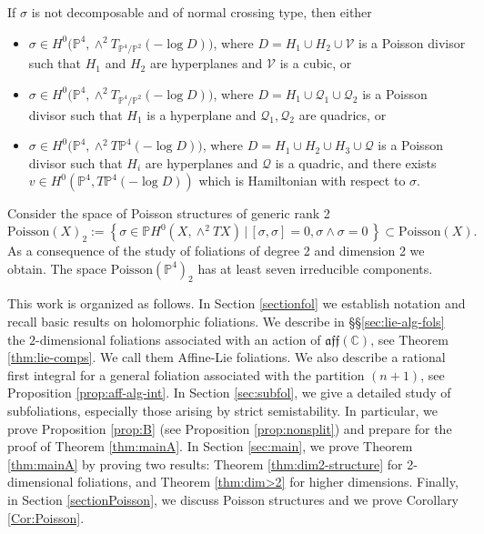 \documentclass[twoside]{amsart}
\numberwithin{equation}{section}
\newcommand{\mf}[1]{\mathfrak{#1}}
\def\PP{{\mathbb{P}}}
\def\CC{{\mathbb{C}}}
\newenvironment{corintro}[1]
{\renewcommand\theinnercorintro{#1}\innercorintro}
{\endinnercorintro}
\theoremstyle{definition}
\begin{document}
\begin{corintro}{C}
If $\sigma$ is not decomposable and of normal crossing type, then either
\begin{itemize}
  \item $\sigma \in H^0\bigl(\PP^{4}, \wedge^2 T_{\PP^{4}/\PP^{2}}(-\log D)\bigr)$,
  where $D = H_1 \cup H_2 \cup \mathcal{V}$ is a Poisson divisor such that
  $H_1$ and $H_2$ are hyperplanes and $\mathcal{V}$ is a cubic, or

  \item $\sigma \in H^0\bigl(\PP^{4}, \wedge^2 T_{\PP^{4}/\PP^{2}}(-\log D)\bigr)$,
  where $D = H_1 \cup \mathcal{Q}_1 \cup \mathcal{Q}_2$ is a Poisson divisor
  such that $H_1$ is a hyperplane and $\mathcal{Q}_1, \mathcal{Q}_2$ are quadrics, or

  \item $\sigma \in H^0\bigl(\PP^{4}, \wedge^2 T\PP^{4}(-\log D)\bigr)$,
  where $D = H_1 \cup H_2 \cup H_3 \cup \mathcal{Q}$ is a Poisson divisor such that
  $H_i$ are hyperplanes and $\mathcal{Q}$ is a quadric, and there exists
  $v \in H^0(\PP^{4}, T\PP^{4}(-\log D))$ which is Hamiltonian with respect to $\sigma$.
\end{itemize}
\end{corintro}







 
Consider the space of Poisson structures of generic rank 2 
$$
\mathrm{Poisson}(X)_2 := \left\{ \sigma \in \mathbb{P}H^0(X, \wedge^2 TX) \, \Big| \, [\sigma,\sigma]=0, \sigma \wedge \sigma=0 \, \right\} \subset \mathrm{Poisson}(X).
$$
As a consequence of the study of foliations of degree 2 and dimension 2 we obtain. 
\begin{corintro}{D}
The space $\mathrm{Poisson}(\mathbb{P}^4)_2$ has at least seven irreducible components.
\end{corintro}



This work is organized as follows. In Section \ref{sectionfol} we establish notation and recall basic results on holomorphic foliations. We describe in \S\S\ref{sec:lie-alg-fols} the $2$-dimensional foliations associated with an action of $\mf{aff(\CC)}$, see Theorem \ref{thm:lie-comps}. We call them Affine-Lie foliations. We also describe a rational first integral for a general foliation associated with the partition $(n+1)$, see Proposition \ref{prop:aff-alg-int}. In Section \ref{sec:subfol}, we give a detailed study of subfoliations, especially those arising by strict semistability. In particular, we prove Proposition \ref{prop:B} (see Proposition \ref{prop:nonsplit}) and prepare for the proof of Theorem \ref{thm:mainA}. In Section \ref{sec:main}, we prove Theorem \ref{thm:mainA} by proving two results:  Theorem \ref{thm:dim2-structure} for 2-dimensional foliations, and Theorem \ref{thm:dim>2} for higher dimensions. Finally, in Section \ref{sectionPoisson}, we discuss Poisson structures and we prove Corollary \ref{Cor:Poisson}. 
\end{document}
